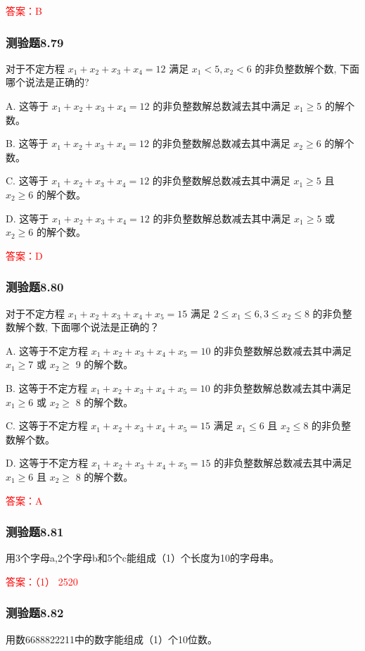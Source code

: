 \documentclass[UTF8, heading=true]{ctexart}
\begin{document}
\textcolor{red}{答案：B}

\subsubsection{测验题8.79}

对于不定方程 $x_1+x_2+x_3+x_4=12$ 满足 $x_1<5, x_2<6$ 的非负整数解个数, 下面哪个说法是正确的?

A. 这等于 $x_1+x_2+x_3+x_4=12$ 的非负整数解总数減去其中满足 $x_1 \geq 5$ 的解个数。

B. 这等于 $x_1+x_2+x_3+x_4=12$ 的非负整数解总数减去其中满足 $x_2 \geq 6$ 的解个数。

C. 这等于 $x_1+x_2+x_3+x_4=12$ 的非负整数解总数减去其中满足 $x_1 \geq 5$ 且 $x_2 \geq 6$ 的解个数。

D. 这等于 $x_1+x_2+x_3+x_4=12$ 的非负整数解总数减去其中满足 $x_1 \geq 5$ 或 $x_2 \geq 6$ 的解个数。

\textcolor{red}{答案：D}

\subsubsection{测验题8.80}

对于不定方程 $x_1+x_2+x_3+x_4+x_5=15$ 满足 $2 \leq x_1 \leq 6,3 \leq x_2 \leq 8$ 的非负整数解个数, 下面哪个说法是正确的？

A. 
这等于不定方程 $x_1+x_2+x_3+x_4+x_5=10$ 的非负整数解总数减去其中满足 $x_1 \geq 7$ 或 $x_2 \geq$ 9 的解个数。

B. 
这等于不定方程 $x_1+x_2+x_3+x_4+x_5=10$ 的非负整数解总数减去其中满足 $x_1 \geq 6$ 或 $x_2 \geq$ 8 的解个数。

C. 这等于不定方程 $x_1+x_2+x_3+x_4+x_5=15$ 满足 $x_1 \leq 6$ 且 $x_2 \leq 8$ 的非负整数解个数。

D. 这等于不定方程 $x_1+x_2+x_3+x_4+x_5=15$ 的非负整数解总数减去其中满足 $x_1 \geq 6$ 且 $x_2 \geq$ 8 的解个数。

\textcolor{red}{答案：A}

\subsubsection{测验题8.81}

用3个字母a,2个字母b和5个c能组成（1）个长度为10的字母串。

\textcolor{red}{答案：（1） 2520}

\subsubsection{测验题8.82}
用数6688822211中的数字能组成（1）个10位数。
\end{document}
